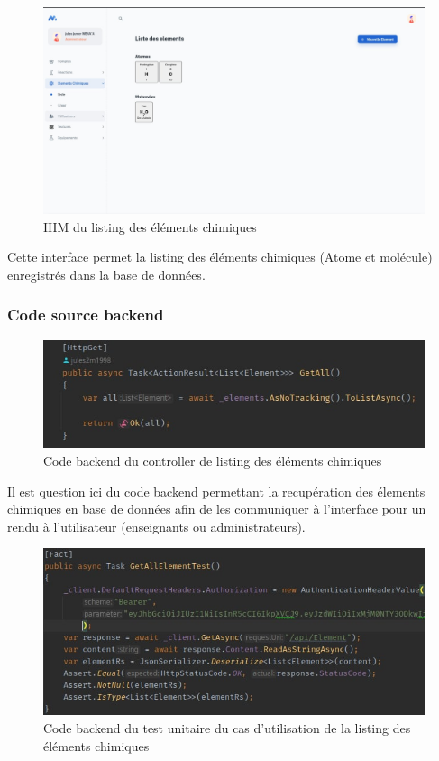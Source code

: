 \begin{figure}[H]
	\centering
	\includegraphics[width=1\textwidth]{img/ietl}
	\caption{IHM du listing des éléments chimiques}
	\label{fig:mesh1}
\end{figure}

Cette interface permet la listing des éléments chimiques (Atome et molécule) enregistrés dans la base de données.

\subsubsection{Code source backend}

\begin{figure}[H]
	\centering
	\includegraphics[width=1\textwidth]{img/cetl}
	\caption{Code backend du controller de listing des éléments chimiques}
\end{figure}

Il est question ici du code backend permettant la recupération des élements chimiques en base de données afin de les communiquer à l'interface pour un rendu à l'utilisateur (enseignants ou administrateurs).

\begin{figure}[H]
	\centering
	\includegraphics[width=1\textwidth]{img/utetlist2}
	\caption{Code backend du test unitaire du cas d'utilisation de la listing des éléments chimiques}
\end{figure}

